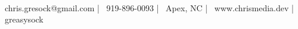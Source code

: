 \documentclass[]{awesome-cv}
\begin{document}
    
\begin{center}
	  \\
	\vspace{2mm}
	{\faEnvelope\ chris.gresock@gmail.com} | {\faMobile\ 919-896-0093} | {\faMapMarker\ Apex, NC} | {\faLink\ www.chrismedia.dev} | {\faGithub\ greasysock}
\end{center}







\ 
\end{document}
